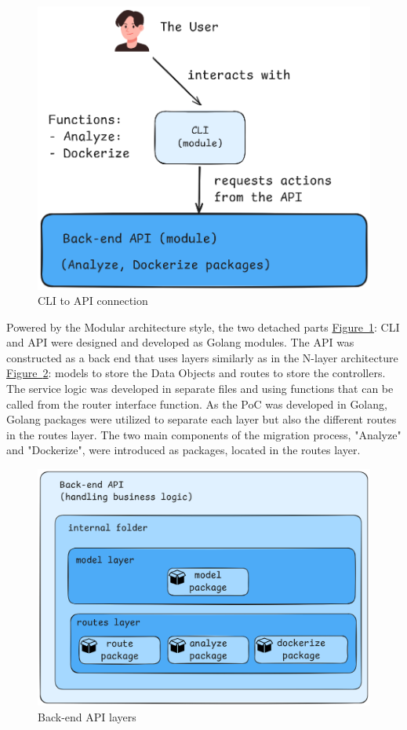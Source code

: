 \documentclass{article}
\newcommand{\FigRef}[1]{\hyperref[#1]{Figure~\ref{#1}}}
\begin{document}
\begin{multicols}{2}
\begin{figure}[H]
    \centering
    \includegraphics[width=\linewidth]{images/cli-api-connection.png}
    \caption{CLI to API connection}
    \label{fig:cli-api-conn}
\end{figure}

Powered by the Modular architecture style, the two detached parts \FigRef{fig:cli-api-conn}: CLI and API were designed and developed as Golang modules. The API was constructed as a back end that uses layers similarly as in the N-layer architecture \FigRef{fig:back-end-api-layers}: models to store the Data Objects and routes to store the controllers. The service logic was developed in separate files and using functions that can be called from the router interface function. As the PoC was developed in Golang, Golang packages were utilized to separate each layer but also the different routes in the routes layer. The two main components of the migration process, "Analyze" and "Dockerize", were introduced as packages, located in the routes layer.

\begin{figure}[H]
    \centering
    \includegraphics[width=\linewidth]{images/back-end-api-layers.png}
    \caption{Back-end API layers}
    \label{fig:back-end-api-layers}
\end{figure}


\end{multicols}
\end{document}

